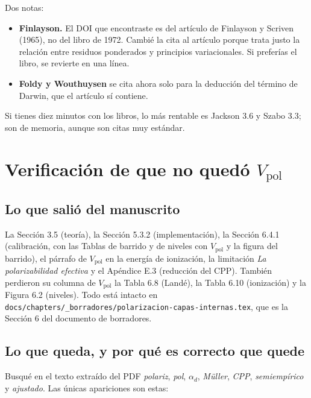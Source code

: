 \documentclass[11pt,a4paper]{article}
\newcommand{\arch}[1]{\texttt{\small #1}}
\begin{document}
Dos notas:

\begin{itemize}
\item \textbf{Finlayson.} El DOI que encontraste es del artículo de Finlayson y Scriven (1965), no del
libro de 1972. Cambié la cita al artículo porque trata justo la relación entre residuos ponderados y
principios variacionales. Si preferías el libro, se revierte en una línea.
\item \textbf{Foldy y Wouthuysen} se cita ahora solo para la deducción del término de Darwin, que el
artículo sí contiene.
\end{itemize}

Si tienes diez minutos con los libros, lo más rentable es Jackson 3.6 y Szabo 3.3; son de
memoria, aunque son citas muy estándar.

\section{Verificación de que no quedó \texorpdfstring{$V_{\text{pol}}$}{V\_pol}}
\label{sec:vpol}

\subsection*{Lo que salió del manuscrito}

La Sección 3.5 (teoría), la Sección 5.3.2 (implementación), la Sección 6.4.1 (calibración, con las
Tablas de barrido y de niveles con $V_{\text{pol}}$ y la figura del barrido), el párrafo de
$V_{\text{pol}}$ en la energía de ionización, la limitación \emph{La polarizabilidad efectiva} y el
Apéndice E.3 (reducción del CPP). También perdieron su columna de $V_{\text{pol}}$ la Tabla 6.8
(Landé), la Tabla 6.10 (ionización) y la Figura 6.2 (niveles). Todo está intacto en
\arch{docs/chapters/\_borradores/polarizacion-capas-internas.tex}, que es la Sección 6 del documento
de borradores.

\subsection*{Lo que queda, y por qué es correcto que quede}

Busqué en el texto extraído del PDF \emph{polariz}, \emph{pol}, $\alpha_d$, \emph{Müller},
\emph{CPP}, \emph{semiempírico} y \emph{ajustado}. Las únicas apariciones son estas:
\end{document}

